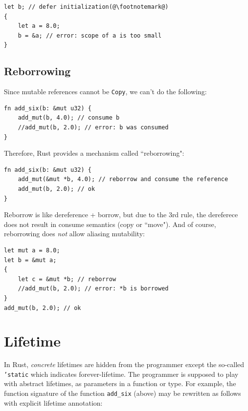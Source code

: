 \documentclass[11pt]{report}
\begin{document}
\begin{lstlisting}
let b; // defer initialization(@\footnotemark@)
{
    let a = 8.0;
    b = &a; // error: scope of a is too small
}
\end{lstlisting}

\subsection*{Reborrowing}

Since mutable references cannot be \texttt{Copy}, we can't do the following:

\begin{lstlisting}
fn add_six(b: &mut u32) {
    add_mut(b, 4.0); // consume b
    //add_mut(b, 2.0); // error: b was consumed
}
\end{lstlisting}

\noindent Therefore, Rust provides a mechanism called ``reborrowing":

\begin{lstlisting}
fn add_six(b: &mut u32) {
    add_mut(&mut *b, 4.0); // reborrow and consume the reference
    add_mut(b, 2.0); // ok
}
\end{lstlisting}

Reborrow is like dereference + borrow, but due to the 3rd rule, the dereferece does not result in consume semantics (copy or ``move"). And of course, reborrowing does \textit{not} allow aliasing mutability:

\begin{lstlisting}
let mut a = 8.0;
let b = &mut a;
{
    let c = &mut *b; // reborrow
    //add_mut(b, 2.0); // error: *b is borrowed
}
add_mut(b, 2.0); // ok
\end{lstlisting}

\section*{Lifetime}

In Rust, \textit{concrete} lifetimes are hidden from the programmer except the so-called \texttt{'static} which indicates forever-lifetime. The programmer is supposed to play with abstract lifetimes, as parameters in a function or type. For example, the function signature of the function \texttt{add\_six} (above) may be rewritten as follows with explicit lifetime annotation:
\end{document}
